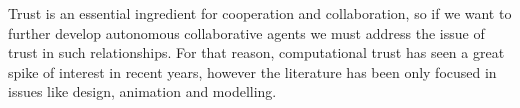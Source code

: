 \noindent  Trust is an essential ingredient for cooperation and collaboration, so if we want to further develop autonomous collaborative agents we must address the issue of trust in such relationships. For that reason, computational trust has seen a great spike of interest in recent years, however the literature has been only focused in issues like design, animation and modelling. 